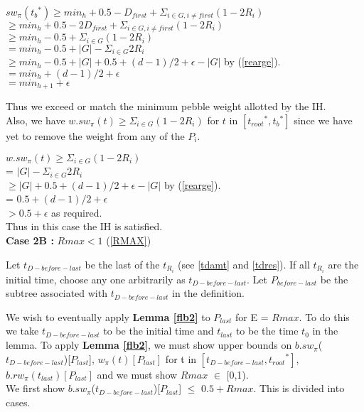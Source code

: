 \documentclass[12pt]{article}
\newcommand{\troots}{{t_{root}}^*}
\newcommand{\tbs}{{t_b}^{*}}
\begin{document}
\noindent
$sw_\pi(\tbs) \geq min_h+0.5-D_{first}+ \Sigma_{i \in G, i \ne first} (1 - 2R_i)$\\
$\geq min_h+0.5-2D_{first}+ \Sigma_{i \in G, i \ne first} (1 - 2R_i)$\\
$\geq min_h-0.5+ \Sigma_{i \in G} (1 - 2R_i)$\\
$= min_h-0.5+ |G| - \Sigma_{i \in G} 2R_i$\\
$\geq min_h - 0.5+ |G| + 0.5 + (d-1)/2 + \epsilon - |G|$ by (\ref{rearge}). \\
$= min_h + (d-1)/2 + \epsilon$\\
$= min_{h+1} + \epsilon$

Thus we exceed or match the minimum pebble weight allotted by the IH.\\

Also, we have $w.sw_\pi(t) \geq \Sigma_{i \in G} (1 - 2R_i)$ for $t$ in $[\troots, \tbs]$ since we have yet to remove the weight from any of the $P_{i}$. 

\noindent
$w.sw_\pi(t) \geq \Sigma_{i \in G} (1 - 2R_i)$\\
= $|G| - \Sigma_{i \in G} 2R_i$\\
$\geq |G| + 0.5 + (d-1)/2 + \epsilon - |G|$ by (\ref{rearge}).\\
=  $0.5 + (d-1)/2 + \epsilon$\\
$> 0.5 + \epsilon$ as required.\\

Thus in this case the IH is satisfied.\\

\noindent
{\bf Case 2B :} $Rmax < 1$ (\ref{RMAX})

Let $t_{D-before-last}$ be the last of the $t_{R_i}$ (see \ref{tdamt} and \ref{tdres}). If all $t_{R_i}$ are the initial time, choose any one arbitrarily as $t_{D-before-last}$. Let $P_{before-last}$ be the subtree associated with $t_{D-before-last}$ in the definition.

We wish to eventually apply {\bf Lemma \ref{flb2}} to $P_{last}$ for E = $Rmax$. To do this we take $t_{D-before-last}$ to be the initial time and $t_{last}$ to be the time $t_0$ in the lemma. To apply  {\bf Lemma \ref{flb2}}, we must show upper bounds on $b.sw_{\pi}$($t_{D-before-last}$)[$P_{last}$], $w_{\pi}(t)[P_{last}]$ for t in $[t_{D-before-last}, \troots]$, $b.rw_\pi(t_{last})[P_{last}]$ and we must show $Rmax$ $\in$ [0,1).\\


We first show $b.sw_{\pi}$($t_{D-before-last}$)[$P_{last}$] $\leq$ $0.5 + Rmax$. This is divided into cases.
\end{document}
